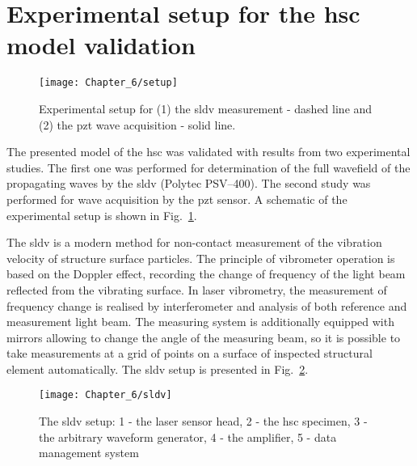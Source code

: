 \section{Experimental setup for the \acs{hsc} model validation}
\label{sec:setup}
\begin{figure}[!htb]
	\begin{center}
		\texttt{[image: Chapter\_6/setup]}
	\end{center}
	\caption{Experimental setup for (1) the \acf{sldv} measurement - dashed line and (2) the \acf{pzt} wave acquisition - solid line.}
	\label{fig:setup}
\end{figure}
The presented model of the \ac{hsc} was validated with results from two experimental studies.
The first one was performed for determination of the full wavefield of the propagating waves by the \ac{sldv} (Polytec PSV–400).
The second study was performed for wave acquisition by the \ac{pzt} sensor.
A schematic of the experimental setup is shown in Fig.~\ref{fig:setup}.

The \ac{sldv} is a modern method for non-contact measurement of the vibration velocity of structure surface particles.
The principle of vibrometer operation is based on the Doppler effect, recording the change of frequency of the light beam reflected from the vibrating surface.
In laser vibrometry, the measurement of frequency change is realised by interferometer and analysis of both reference and measurement light beam.
The measuring system is additionally equipped with mirrors allowing to change the angle of the measuring beam, so it is possible to take measurements at a grid of points on a surface of inspected structural element automatically.
The \ac{sldv} setup is presented in Fig.~\ref{fig:sldv}.
\begin{figure}[!htb]
	\begin{center}
		\texttt{[image: Chapter\_6/sldv]}
	\end{center}
	\caption{The \acf{sldv} setup: 1 - the laser sensor head, 2 - the \acf{hsc} specimen, 3 - the arbitrary waveform generator, 4 - the amplifier, 5 - data management system}
	\label{fig:sldv}
\end{figure}


